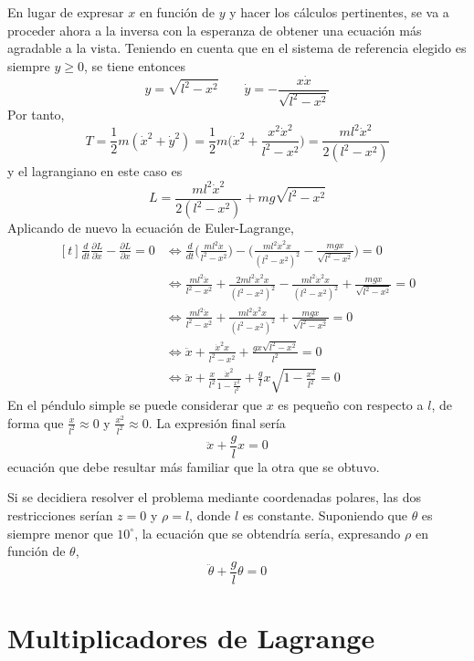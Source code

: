 \documentclass[12pt]{report}
\begin{document}
\begin{example}
\vspace{2mm}
En lugar de expresar $x$ en función de $y$ y hacer los cálculos pertinentes, se va a proceder ahora a la inversa con la esperanza de obtener una ecuación más agradable a la vista. Teniendo en cuenta que en el sistema de referencia elegido es siempre $y \geq 0$, se tiene entonces
\[y = \sqrt{l^2-x^2} \qquad \dot{y} = -\frac{x\dot{x}}{\sqrt{l^2-x^2}}\]
Por tanto,
\[T = \frac{1}{2}m(\dot{x}^2+\dot{y}^2) = \frac{1}{2}m\biggl(\dot{x}^2+\frac{x^2\dot{x}^2}{l^2-x^2}  \biggr)= \frac{ml^2\dot{x}^2}{2(l^2-x^2)}\]
y el lagrangiano en este caso es
\[L = \frac{ml^2\dot{x}^2}{2(l^2-x^2)}+mg\sqrt{l^2-x^2} \]
Aplicando de nuevo la ecuación de Euler-Lagrange,
\[
\begin{aligned}[t]
\frac{d}{dt}\frac{\partial L}{\partial \dot{x}}-\frac{\partial L}{\partial x} = 0 &\iff \frac{d}{dt}\biggl(\frac{ml^2\dot{x}}{l^2-x^2}\biggr)-\biggl(\frac{ml^2\dot{x}^2x}{(l^2-x^2)^2}-\frac{mgx}{\sqrt{l^2-x^2}} \biggr) = 0 \\
&\iff \frac{ml^2\ddot{x}}{l^2-x^2}+\frac{2ml^2\dot{x}^2x}{(l^2-x^2)^2}-\frac{ml^2\dot{x}^2x}{(l^2-x^2)^2}+\frac{mgx}{\sqrt{l^2-x^2}} = 0 \\
&\iff \frac{ml^2\ddot{x}}{l^2-x^2}+\frac{ml^2\dot{x}^2x}{(l^2-x^2)^2}+\frac{mgx}{\sqrt{l^2-x^2}}=0 \\
&\iff \ddot{x} + \frac{\dot{x}^2x}{l^2-x^2} + \frac{gx\sqrt{l^2-x^2}}{l^2} = 0 \\
&\iff \ddot{x}+\frac{x}{l^2}\frac{\dot{x}^2}{1-\frac{x^2}{l^2}}+\frac{g}{l}x\sqrt{1-\frac{x^2}{l^2}}=0
\end{aligned}
\]
En el péndulo simple se puede considerar que $x$ es pequeño con respecto a $l$, de forma que $\frac{x}{l^2} \approx 0$ y $\frac{x^2}{l^2} \approx 0$. La expresión final sería
\[\ddot{x}+\frac{g}{l}x=0\]
ecuación que debe resultar más familiar que la otra que se obtuvo.

\vspace{2mm}
Si se decidiera resolver el problema mediante coordenadas polares, las dos restricciones serían $z = 0$ y $\rho = l$, donde $l$ es constante. Suponiendo que $\theta$ es siempre menor que $10^\circ$, la ecuación que se obtendría sería, expresando $\rho$ en función de $\theta$,
\[\ddot{\theta}+\frac{g}{l}\theta = 0\]
\end{example}

\section{Multiplicadores de Lagrange}
\end{document}
